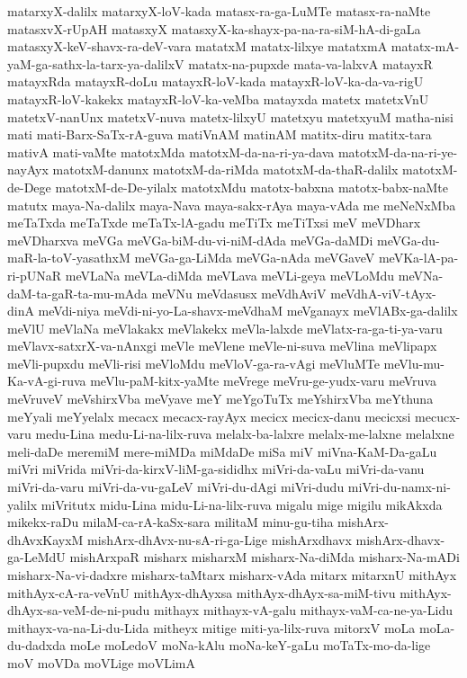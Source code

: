 {matarxyX-dalilx
matarxyX-loV-kada
matasx-ra-ga-LuMTe
matasx-ra-naMte
matasxvX-rUpAH
matasxyX
matasxyX-ka-shayx-pa-na-ra-siM-hA-di-gaLa
matasxyX-keV-shavx-ra-deV-vara
matatxM
matatx-lilxye
matatxmA
matatx-mA-yaM-ga-sathx-la-tarx-ya-dalilxV
matatx-na-pupxde
mata-va-lalxvA
matayxR
matayxRda
matayxR-doLu
matayxR-loV-kada
matayxR-loV-ka-da-va-rigU
matayxR-loV-kakekx
matayxR-loV-ka-veMba
matayxda
matetx
matetxVnU
matetxV-nanUnx
matetxV-nuva
matetx-lilxyU
matetxyu
matetxyuM
matha-nisi
mati
mati-Barx-SaTx-rA-guva
matiVnAM
matinAM
matitx-diru
matitx-tara
mativA
mati-vaMte
matotxMda
matotxM-da-na-ri-ya-dava
matotxM-da-na-ri-ye-nayAyx
matotxM-danunx
matotxM-da-riMda
matotxM-da-thaR-dalilx
matotxM-de-Dege
matotxM-de-De-yilalx
matotxMdu
matotx-babxna
matotx-babx-naMte
matutx
maya-Na-dalilx
maya-Nava
maya-sakx-rAya
maya-vAda
me
meNeNxMba
meTaTxda
meTaTxde
meTaTx-lA-gadu
meTiTx
meTiTxsi
meV
meVDharx
meVDharxva
meVGa
meVGa-biM-du-vi-niM-dAda
meVGa-daMDi
meVGa-du-maR-la-toV-yasathxM
meVGa-ga-LiMda
meVGa-nAda
meVGaveV
meVKa-lA-pa-ri-pUNaR
meVLaNa
meVLa-diMda
meVLava
meVLi-geya
meVLoMdu
meVNa-daM-ta-gaR-ta-mu-mAda
meVNu
meVdasusx
meVdhAviV
meVdhA-viV-tAyx-dinA
meVdi-niya
meVdi-ni-yo-La-shavx-meVdhaM
meVganayx
meVlABx-ga-dalilx
meVlU
meVlaNa
meVlakakx
meVlakekx
meVla-lalxde
meVlatx-ra-ga-ti-ya-varu
meVlavx-satxrX-va-nAnxgi
meVle
meVlene
meVle-ni-suva
meVlina
meVlipapx
meVli-pupxdu
meVli-risi
meVloMdu
meVloV-ga-ra-vAgi
meVluMTe
meVlu-mu-Ka-vA-gi-ruva
meVlu-paM-kitx-yaMte
meVrege
meVru-ge-yudx-varu
meVruva
meVruveV
meVshirxVba
meVyave
meY
meYgoTuTx
meYshirxVba
meYthuna
meYyali
meYyelalx
mecacx
mecacx-rayAyx
mecicx
mecicx-danu
mecicxsi
mecucx-varu
medu-Lina
medu-Li-na-lilx-ruva
melalx-ba-lalxre
melalx-me-lalxne
melalxne
meli-daDe
meremiM
mere-miMDa
miMdaDe
miSa
miV
miVna-KaM-Da-gaLu
miVri
miVrida
miVri-da-kirxV-liM-ga-sididhx
miVri-da-vaLu
miVri-da-vanu
miVri-da-varu
miVri-da-vu-gaLeV
miVri-du-dAgi
miVri-dudu
miVri-du-namx-ni-yalilx
miVritutx
midu-Lina
midu-Li-na-lilx-ruva
migalu
mige
migilu
mikAkxda
mikekx-raDu
milaM-ca-rA-kaSx-sara
militaM
minu-gu-tiha
mishArx-dhAvxKayxM
mishArx-dhAvx-nu-sA-ri-ga-Lige
mishArxdhavx
mishArx-dhavx-ga-LeMdU
mishArxpaR
misharx
misharxM
misharx-Na-diMda
misharx-Na-mADi
misharx-Na-vi-dadxre
misharx-taMtarx
misharx-vAda
mitarx
mitarxnU
mithAyx
mithAyx-cA-ra-veVnU
mithAyx-dhAyxsa
mithAyx-dhAyx-sa-miM-tivu
mithAyx-dhAyx-sa-veM-de-ni-pudu
mithayx
mithayx-vA-galu
mithayx-vaM-ca-ne-ya-Lidu
mithayx-va-na-Li-du-Lida
mitheyx
mitige
miti-ya-lilx-ruva
mitorxV
moLa
moLa-du-dadxda
moLe
moLedoV
moNa-kAlu
moNa-keY-gaLu
moTaTx-mo-da-lige
moV
moVDa
moVLige
moVLimA
}
